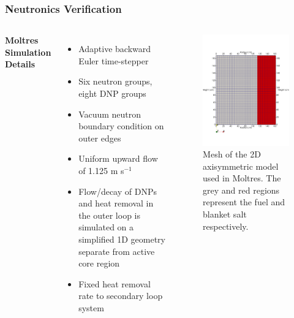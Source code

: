 \begin{frame}
	\frametitle{Neutronics Verification}
	\begin{columns}
		\column{5.5cm}
		\textbf{Moltres Simulation Details}
		\begin{itemize}
			\small
			\item Adaptive backward Euler time-stepper
			\item Six neutron groups, eight \gls{DNP} groups
			\item Vacuum neutron boundary condition on outer edges
			\item Uniform upward flow of 1.125 m s$^{-1}$
			\item Flow/decay of \glspl{DNP} and heat removal in the outer loop
			is simulated on a simplified 1D geometry separate from active core
			region
			\item Fixed heat removal rate to secondary loop system
		\end{itemize}
		\column{4.5cm}
		\begin{figure}
			\centering
			\includegraphics[width=.9\textwidth]{../paper/figures/mesh}
			\caption{Mesh of the 2D axisymmetric model used in Moltres. The
			grey and red regions represent the fuel and blanket salt
			respectively.}
			\label{fig:mesh}
		\end{figure}
	\end{columns}
\end{frame}

